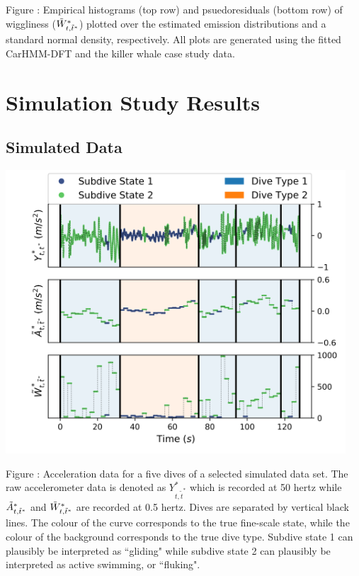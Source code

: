 \documentclass{article}
\begin{document}
        \noindent Figure : Empirical histograms (top row) and psuedoresiduals (bottom row) of wiggliness ($\tilde{W}^*_{t,\tilde t^*}$) plotted over the estimated emission distributions and a standard normal density, respectively. All plots are generated using the fitted CarHMM-DFT and the killer whale case study data.
        \addtocounter{fignum}{1}


\newpage
\section{Simulation Study Results}

    \subsection{Simulated Data}
    
        \begin{center}
    	\includegraphics[width=5in]{../Plots/sim_data.png}
    	\end{center}
    	
    	\noindent Figure : Acceleration data for a five dives of a selected simulated data set. The raw accelerometer data is denoted as $Y^*_{t,\tilde t^*}$ which is recorded at 50 hertz while $\tilde{A}^*_{t,\tilde t^*}$ and $\tilde{W}^*_{t,\tilde t^*}$ are recorded at 0.5 hertz. Dives are separated by vertical black lines. The colour of the curve corresponds to the true fine-scale state, while the colour of the background corresponds to the true dive type. Subdive state 1 can plausibly be interpreted as ``gliding" while subdive state 2 can plausibly be interpreted as active swimming, or ``fluking".
    	\addtocounter{fignum}{1}
\end{document}
